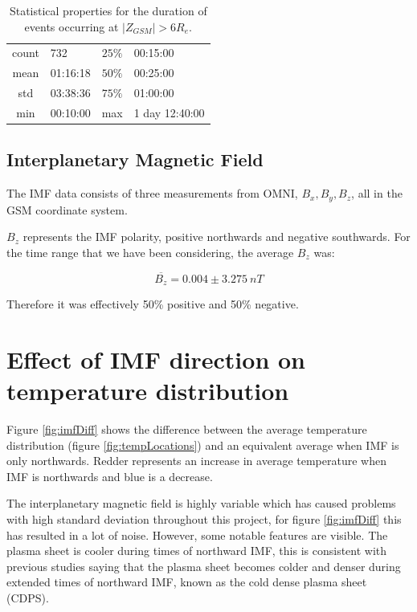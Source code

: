 \documentclass[12pt]{article}
\begin{document}
\begin{table}[]
    \begin{minipage}[c]{0.57\textwidth}
        \centering
        \begin{tabular}{||c|l||c|l||}
            \hline
            count & 732 & $25\%$ & 00:15:00 \\
            mean & 01:16:18 & $50\%$ & 00:25:00 \\
            std & 03:38:36 & $75\%$ & 01:00:00 \\
            min & 00:10:00 & max & 1 day 12:40:00 \\
            \hline
        \end{tabular}
    \end{minipage}\hfill
    \begin{minipage}[c]{0.4\textwidth}
        \caption{Statistical properties for the duration of events occurring at $|Z_{GSM}|>6R_e$.}
        \label{tab:event_durn}
    \end{minipage}
\end{table}

\subsection{Interplanetary Magnetic Field}
The IMF data consists of three measurements from OMNI, $B_x, B_y, B_z$, all in the GSM coordinate system.

$B_z$ represents the IMF polarity, positive northwards and negative southwards. For the time range that we have been considering, the average $B_z$ was:

\begin{equation}
    \overline{B_z} = 0.004 \pm 3.275\ nT
\end{equation}

Therefore it was effectively 50\% positive and 50\% negative. 

\section{Effect of IMF direction on temperature distribution}
Figure \ref{fig:imfDiff} shows the difference between the average temperature distribution (figure \ref{fig:tempLocations}) and an equivalent average when IMF is only northwards. Redder represents an increase in average temperature when IMF is northwards and blue is a decrease.

The interplanetary magnetic field is highly variable which has caused problems with high standard deviation throughout this project, for figure \ref{fig:imfDiff} this has resulted in a lot of noise. However, some notable features are visible. The plasma sheet is cooler during times of northward IMF, this is consistent with previous studies \cite{TAYLOR20081619} saying that the plasma sheet becomes colder and denser during extended times of northward IMF, known as the cold dense plasma sheet (CDPS).
\end{document}
